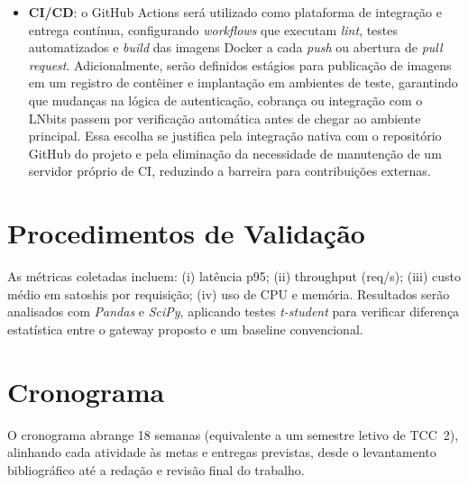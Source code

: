 \documentclass[openright]{normas-utf-tex}
\begin{document}
\begin{itemize}
    \item \textbf{CI/CD}: o GitHub Actions será utilizado como plataforma de integração e entrega contínua, configurando \textit{workflows} que executam \textit{lint}, testes automatizados e \textit{build} das imagens Docker a cada \textit{push} ou abertura de \textit{pull request}. Adicionalmente, serão definidos estágios para publicação de imagens em um registro de contêiner e implantação em ambientes de teste, garantindo que mudanças na lógica de autenticação, cobrança ou integração com o LNbits passem por verificação automática antes de chegar ao ambiente principal. Essa escolha se justifica pela integração nativa com o repositório GitHub do projeto e pela eliminação da necessidade de manutenção de um servidor próprio de CI, reduzindo a barreira para contribuições externas.
\end{itemize}

\section{Procedimentos de Validação}
As métricas coletadas incluem: (i) latência p95; (ii) throughput (req/s); (iii) custo médio em satoshis por requisição; (iv) uso de CPU e memória. Resultados serão analisados com \textit{Pandas} e \textit{SciPy}, aplicando testes \textit{t-student} para verificar diferença estatística entre o gateway proposto e um baseline convencional.

\section{Cronograma}

O cronograma abrange 18 semanas (equivalente a um semestre letivo de TCC~2), alinhando cada atividade às metas e entregas previstas, desde o levantamento bibliográfico até a redação e revisão final do trabalho.
\end{document}
